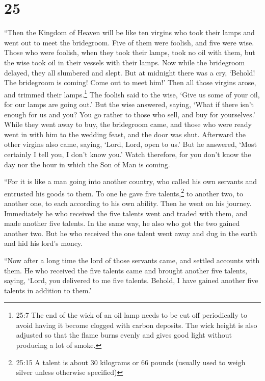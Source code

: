 \hypertarget{section-24}{%
\section{25}\label{section-24}}

 ``Then the Kingdom of Heaven will be like ten virgins who
took their lamps and went out to meet the bridegroom.  Five
of them were foolish, and five were wise.  Those who were
foolish, when they took their lamps, took no oil with them, 
but the wise took oil in their vessels with their lamps. 
Now while the bridegroom delayed, they all slumbered and slept.
 But at midnight there was a cry, `Behold! The bridegroom is
coming! Come out to meet him!'  Then all those virgins
arose, and trimmed their lamps.\footnote{25:7 The end of the wick of an
  oil lamp needs to be cut off periodically to avoid having it become
  clogged with carbon deposits. The wick height is also adjusted so that
  the flame burns evenly and gives good light without producing a lot of
  smoke.}  The foolish said to the wise, `Give us some of
your oil, for our lamps are going out.'  But the wise
answered, saying, `What if there isn't enough for us and you? You go
rather to those who sell, and buy for yourselves.'  While
they went away to buy, the bridegroom came, and those who were ready
went in with him to the wedding feast, and the door was shut.
 Afterward the other virgins also came, saying, `Lord,
Lord, open to us.'  But he answered, `Most certainly I tell
you, I don't know you.'  Watch therefore, for you don't
know the day nor the hour in which the Son of Man is coming.

 ``For it is like a man going into another country, who
called his own servants and entrusted his goods to them. 
To one he gave five talents,\footnote{25:15 A talent is about 30
  kilograms or 66 pounds (usually used to weigh silver unless otherwise
  specified)} to another two, to another one, to each according to his
own ability. Then he went on his journey.  Immediately he
who received the five talents went and traded with them, and made
another five talents.  In the same way, he also who got the
two gained another two.  But he who received the one talent
went away and dug in the earth and hid his lord's money.

 ``Now after a long time the lord of those servants came,
and settled accounts with them.  He who received the five
talents came and brought another five talents, saying, `Lord, you
delivered to me five talents. Behold, I have gained another five talents
in addition to them.'

